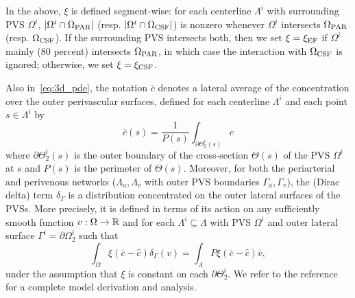 In the above, $\xi$ is defined segment-wise: for each centerline $\Lambda^i$ with surrounding PVS $\Omega^i$, $|\Omega^i \cap \Omega_{\rm{PAR}}|$ (resp. $|\Omega^i \cap \Omega_{\rm{CSF}}|$) is nonzero whenever $\Omega^i$ intersects $\Omega_{\rm{PAR}}$ (resp. $\Omega_{\rm{CSF}}$). If the surrounding PVS intersects both, then we set $\xi = \xi_{\rm EF}$ if $\Omega^i$ mainly ($80$ percent) intersects $\Omega_{\rm{PAR}}$, in which case the interaction with $\Omega_{\rm{CSF}}$ is ignored; otherwise, we set $\xi = \xi_{\rm CSF}$. 
 
Also in~\eqref{eq:3d_pde}, the notation $\overline{c}$ denotes a lateral average of the concentration over the outer perivascular surfaces, defined for each centerline $\Lambda^i$ and each point $s \in \Lambda^i$ by
\begin{equation}
  \overline{c}(s) = \frac{1}{P(s)} \int_{\partial \Theta_2^i(s)} c 
\end{equation}
where $\partial \Theta_2^i(s)$ is the outer boundary of the cross-section $\Theta(s)$ of the PVS $\Omega^i$ at $s$ and $P(s)$ is the perimeter of $\Theta(s)$. Moreover, for both the periarterial and perivenous networks ($\Lambda_a, \Lambda_v$ with outer PVS boundaries $\Gamma_a, \Gamma_v$), the (Dirac delta) term $\delta_\Gamma$ is a distribution concentrated on the outer lateral surfaces of the PVSs. More precisely, it is defined in terms of its  action on any sufficiently smooth function $v : \Omega \rightarrow \mathbb{R}$ and for each $\Lambda^i \subseteq \Lambda$ with PVS $\Omega^i$ and outer lateral surface $\Gamma^i = \partial \Omega^i_2$ such that
\begin{equation}
  \int_{\Omega} \xi (\overline{c} - \hat c ) \delta_\Gamma (v) =
  \int_{\Lambda} P \xi (\overline{c} - \hat c ) \overline{v}, 
\end{equation}
under the assumption that $\xi$ is constant on each $\partial
\Theta_2^i$.
We refer to the reference~\cite{masri2023modelling} for a complete model derivation and analysis.

